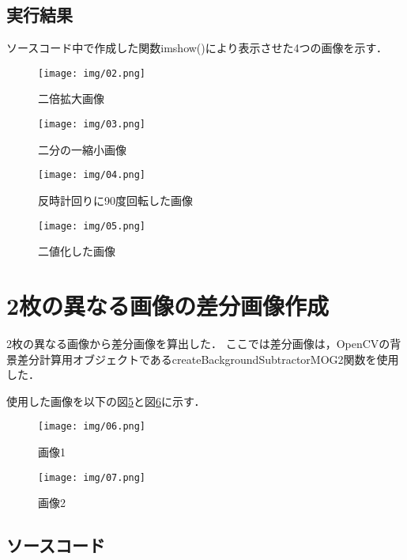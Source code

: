 \documentclass{article}
\begin{document}
\subsection{実行結果}

ソースコード中で作成した関数imshow()により表示させた4つの画像を示す．

\begin{figure}[H]
\centering
\texttt{[image: img/02.png]}
\caption{二倍拡大画像}
\label{02}
\end{figure}

\begin{figure}[H]
\centering
\texttt{[image: img/03.png]}
\caption{二分の一縮小画像}
\label{03}
\end{figure}

\begin{figure}[H]
\centering
\texttt{[image: img/04.png]}
\caption{反時計回りに90度回転した画像}
\label{04}
\end{figure}

\begin{figure}[H]
\centering
\texttt{[image: img/05.png]}
\caption{二値化した画像}
\label{05}
\end{figure}

\section{2枚の異なる画像の差分画像作成}

2枚の異なる画像から差分画像を算出した．
ここでは差分画像は，OpenCVの背景差分計算用オブジェクトであるcreateBackgroundSubtractorMOG2関数を使用した．

使用した画像を以下の図\ref{06}と図\ref{07}に示す．

\begin{figure}[H]
\centering
\texttt{[image: img/06.png]}
\caption{画像1}
\label{06}
\end{figure}

\begin{figure}[H]
\centering
\texttt{[image: img/07.png]}
\caption{画像2}
\label{07}
\end{figure}

\subsection{ソースコード}
\end{document}
